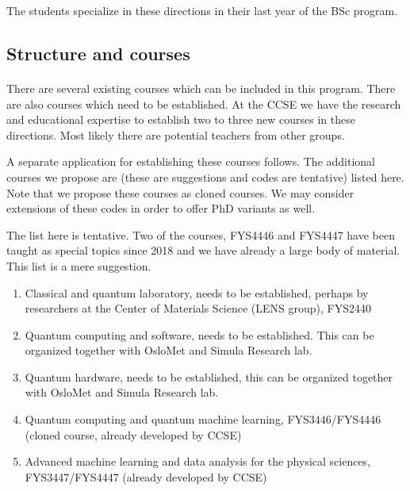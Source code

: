 \documentclass[%
oneside,                 %
final,                   %
10pt]{article}
\begin{document}
\noindent
The students specialize in these directions in their last year of the BSc program.



\subsection{Structure and courses}

\paragraph{}
There are several existing courses which can be included in this program. There are also courses which need to be established. At the CCSE we have the research and educational expertise to establish two to three new courses in these directions. Most likely there are potential teachers from other groups.

A separate application for establishing these courses follows. The additional courses we propose are (these are suggestions and codes are tentative) listed here. Note that we propose these courses as cloned courses. We may consider extensions of these codes in order to offer PhD variants as well.

The list here is tentative. Two of the courses, FYS4446 and FYS4447 have been taught as special topics since 2018 and we have already a large body of material.
This list is a mere suggestion.

\begin{enumerate}
\item Classical and quantum laboratory, needs to be established, perhaps by researchers at the Center of Materials Science (LENS group), FYS2440

\item Quantum computing and software, needs to be established. This can be organized together with OsloMet and Simula Research lab.

\item Quantum hardware, needs to be established, this can be organized together with OsloMet and Simula Research lab. 

\item Quantum computing and quantum machine learning, FYS3446/FYS4446 (cloned course, already developed by CCSE)

\item Advanced machine learning and data analysis for the physical sciences, FYS3447/FYS4447 (already developed by CCSE)
\end{enumerate}
\end{document}
